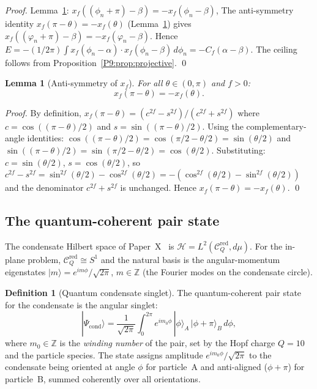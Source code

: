 \documentclass[11pt,a4paper]{article}
\newtheorem{lemma}[theorem]{Lemma}
\theoremstyle{definition}
\newtheorem{definition}[theorem]{Definition}
\theoremstyle{remark}
\newcommand{\ZZ}{\mathbb{Z}}
\begin{document}
\begin{proof}
Lemma~\ref{P9:lem:antisymmetry}: $x_f((\phi_n+\pi)-\beta)=-x_f(\phi_n-\beta)$,
The anti-symmetry identity $x_f(\pi-\theta)=-x_f(\theta)$ (Lemma~\ref{P9:lem:antisymmetry})
gives $x_f((\varphi_n+\pi)-\beta) = -x_f(\varphi_n-\beta)$.
Hence $E=-(1/2\pi)\int x_f(\phi_n-\alpha)\cdot x_f(\phi_n-\beta)\,d\phi_n=-C_f(\alpha-\beta)$.
The ceiling follows from Proposition~\ref{P9:prop:projective}.
\qed
\end{proof}
 
\begin{lemma}[Anti-symmetry of $x_f$]
\label{P9:lem:antisymmetry}
For all $\theta\in(0,\pi)$ and $f>0$:
\begin{equation}
  x_f(\pi-\theta) = -x_f(\theta).
  \label{P9:eq:antisymmetry}
\end{equation}
\end{lemma}
\begin{proof}
By definition, $x_f(\pi-\theta) = (c^{2f}-s^{2f})/(c^{2f}+s^{2f})$
where $c=\cos((\pi-\theta)/2)$ and $s=\sin((\pi-\theta)/2)$.
Using the complementary-angle identities:
$\cos((\pi-\theta)/2) = \cos(\pi/2-\theta/2) = \sin(\theta/2)$
and $\sin((\pi-\theta)/2) = \sin(\pi/2-\theta/2) = \cos(\theta/2)$.
Substituting: $c=\sin(\theta/2)$, $s=\cos(\theta/2)$, so
$c^{2f}-s^{2f} = \sin^{2f}(\theta/2)-\cos^{2f}(\theta/2) = -(\cos^{2f}(\theta/2)-\sin^{2f}(\theta/2))$
and the denominator $c^{2f}+s^{2f}$ is unchanged.
Hence $x_f(\pi-\theta) = -x_f(\theta)$. \qed
\end{proof}
 
\subsection{The quantum-coherent pair state}
 
The condensate Hilbert space of Paper~X~\cite{Paper10} is
$\mathcal{H} = L^2(\mathcal{C}_Q^\mathrm{red},d\mu)$. For the in-plane problem, $\mathcal{C}_Q^\mathrm{red}\cong S^1$
and the natural basis is the angular-momentum eigenstates
$|m\rangle = e^{im\phi}/\sqrt{2\pi}$, $m\in\ZZ$
(the Fourier modes on the condensate circle).
 
\begin{definition}[Quantum condensate singlet]
\label{P9:def:quantum_singlet}
The quantum-coherent pair state for the condensate is the angular singlet:
\begin{equation}
  |\Psi_\mathrm{cond}\rangle
  = \frac{1}{\sqrt{2\pi}}
  \int_0^{2\pi} e^{im_0\phi}\,|\phi\rangle_A\,|\phi+\pi\rangle_B\,d\phi,
  \label{P9:eq:qsinglet}
\end{equation}
where $m_0\in\ZZ$ is the \emph{winding number} of the pair, set by the Hopf
charge $Q=10$ and the particle species.
The state assigns amplitude $e^{im_0\phi}/\sqrt{2\pi}$ to the condensate
being oriented at angle $\phi$ for particle~A and anti-aligned ($\phi+\pi$) for
particle~B, summed coherently over all orientations.
\end{definition}
 
\end{document}
